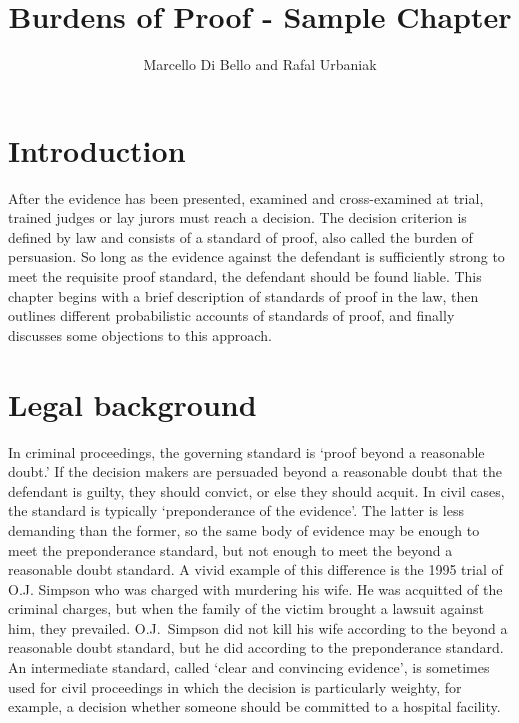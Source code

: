 \documentclass[10pt,dvipsnames]{scrartcl}
\title{Burdens of Proof - Sample Chapter}
\author{Marcello Di Bello and Rafal Urbaniak}
\date{}
\begin{document}
\maketitle

\tableofcontents

\section{Introduction}\label{introduction}

After the evidence has been presented, examined and cross-examined at
trial, trained judges or lay jurors must reach a decision. The decision
criterion is defined by law and consists of a standard of proof, also
called the burden of persuasion. So long as the evidence against the
defendant is sufficiently strong to meet the requisite proof standard,
the defendant should be found liable. This chapter begins with a brief
description of standards of proof in the law, then outlines different
probabilistic accounts of standards of proof, and finally discusses some
objections to this approach.

\section{Legal background}\label{legal-background}

\label{subsec:legal-background}

In criminal proceedings, the governing standard is `proof beyond a
reasonable doubt.' If the decision makers are persuaded beyond a
reasonable doubt that the defendant is guilty, they should convict, or
else they should acquit. In civil cases, the standard is typically
`preponderance of the evidence'. The latter is less demanding than the
former, so the same body of evidence may be enough to meet the
preponderance standard, but not enough to meet the beyond a reasonable
doubt standard. A vivid example of this difference is the 1995 trial of
O.J. Simpson who was charged with murdering his wife. He was acquitted
of the criminal charges, but when the family of the victim brought a
lawsuit against him, they prevailed. O.J.~Simpson did not kill his wife
according to the beyond a reasonable doubt standard, but he did
according to the preponderance standard. An intermediate standard,
called `clear and convincing evidence', is sometimes used for civil
proceedings in which the decision is particularly weighty, for example,
a decision whether someone should be committed to a hospital facility.
\end{document}
